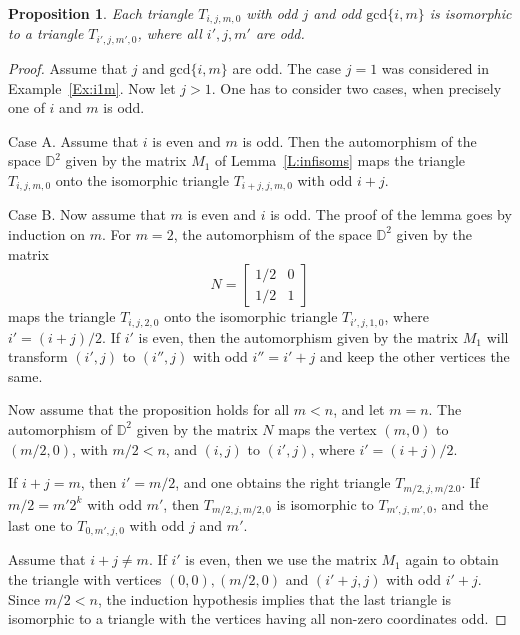 \documentclass[12pt]{amsart}
\def\mr{\mathrm}
\def\mbD{\mathbb{D}}
\theoremstyle{plain}
\newtheorem{proposition}[theorem]{Proposition}
\theoremstyle{definition}
\numberwithin{equation}{section}
\begin{document}
\begin{proposition}\label{P:oddcoords}
Each triangle $T_{i,j,m,0}$ with odd $j$ and odd $\mr{gcd}\{i,m\}$
is isomorphic to a triangle $T_{i',j,m',0}$, where all $i', j, m'$ are
odd.
\end{proposition}
\begin{proof}
Assume that $j$ and $\mr{gcd}\{i,m\}$ are odd.
The case $j = 1$ was considered in Example~\ref{Ex:i1m}. Now let $j > 1$.
One has to consider two cases, when precisely one of $i$ and $m$  is odd.

Case A. Assume that $i$ is even and $m$ is odd. Then the automorphism of the space $\mbD^2$
given by the matrix $M_1$ of Lemma~\ref{L:infisoms} maps the triangle $T_{i,j,m,0}$ onto the
isomorphic triangle $T_{i+j,j,m,0}$ with odd $i+j$.

Case B. Now assume that $m$ is even and $i$ is odd. The proof of the lemma goes by induction on $m$. For $m = 2$, the automorphism of the space $\mbD^2$ given by the matrix
\begin{equation}\label{E:N}
N =
\begin{bmatrix}
1/2 & 0 \\
1/2 & 1
\end{bmatrix}
\end{equation}
maps the triangle $T_{i,j,2,0}$ onto the isomorphic triangle $T_{i',j,1,0}$, where $i' =
(i+j)/2$. If $i'$ is even, then the automorphism given by the matrix $M_1$ will transform $(i',j)$ to $(i'',j)$ with odd $i'' = i' + j$ and keep the other vertices the same.

Now assume that the proposition holds for all $m < n$, and let $m = n$. The automorphism of
$\mbD^2$ given by the matrix $N$ maps the vertex $(m,0)$ to $(m/2,0)$, with $m/2 < n$,
and $(i,j)$ to $(i',j)$, where $i' = (i+j)/2$.

If $i+j = m$, then $i' = m/2$, and one obtains the right triangle $T_{m/2,j,m/2.0}$. If $m/2 =
m' 2^k$ with odd $m'$, then $T_{m/2,j,m/2,0}$ is isomorphic to $T_{m',j,m',0}$, and the last one to $T_{0,m',j,0}$ with odd $j$ and $m'$.

Assume that $i+j \neq m$. If $i'$ is even, then we use the matrix $M_1$ again to obtain the triangle with vertices $(0,0), (m/2,0)$ and $(i'+j,j)$ with odd $i'+j$. Since $m/2 < n$, the induction hypothesis implies that the last triangle is isomorphic to a triangle with the vertices having all non-zero coordinates odd.
\end{proof}
\end{document}
